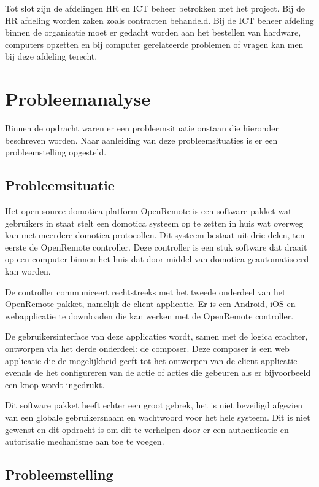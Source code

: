 \documentclass[]{article}
\begin{document}
Tot slot zijn de afdelingen HR en ICT beheer betrokken met het project. Bij
de HR afdeling worden zaken zoals contracten behandeld. Bij de ICT beheer
afdeling binnen de organisatie moet er gedacht worden aan het bestellen van
hardware, computers opzetten en bij computer gerelateerde problemen of
vragen kan men bij deze afdeling terecht.

\newpage
\section{Probleemanalyse}
Binnen de opdracht waren er een probleemsituatie onstaan die hieronder
beschreven worden. Naar aanleiding van deze probleemsituaties is er een
probleemstelling opgesteld.

\subsection{Probleemsituatie}

Het open source domotica platform OpenRemote is een software pakket wat
gebruikers in staat stelt een domotica systeem op te zetten in huis wat
overweg kan met meerdere domotica protocollen. Dit systeem bestaat uit drie
delen, ten eerste de OpenRemote controller. Deze controller is een stuk
software dat draait op een computer binnen het huis dat door middel van
domotica geautomatiseerd kan worden.

De controller communiceert rechtstreeks met het tweede onderdeel van het
OpenRemote pakket, namelijk de client applicatie. Er is een Android, iOS en
webapplicatie te downloaden die kan werken met de OpenRemote controller.

De gebruikersinterface van deze applicaties wordt, samen met de logica
erachter, ontworpen via het derde onderdeel: de composer. Deze composer is
een web applicatie die de mogelijkheid geeft tot het ontwerpen van de
client applicatie evenals de het configureren van de actie of acties die
gebeuren als er bijvoorbeeld een knop wordt ingedrukt.

Dit software pakket heeft echter een groot gebrek, het is niet beveiligd
afgezien van een globale gebruikersnaam en wachtwoord voor het hele
systeem. Dit is niet gewenst en dit opdracht is om dit te verhelpen door
er een authenticatie en autorisatie mechanisme aan toe te voegen.

\subsection{Probleemstelling}
\end{document}

